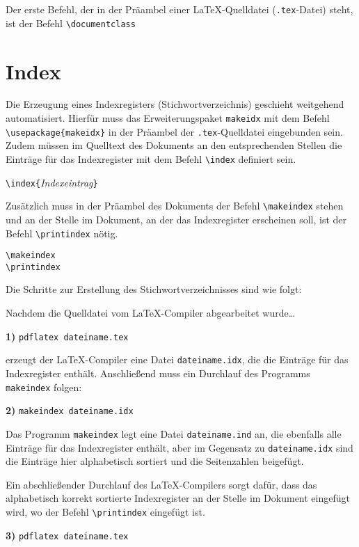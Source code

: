 Der erste Befehl, der in der Präambel einer \LaTeX-Quelldatei (\verb!.tex!-Datei) steht, ist der Befehl \verb!\documentclass!
\begin{document}
\section{Index}

Die Erzeugung eines
Indexregisters (Stichwortverzeichnis)
geschieht weitgehend automatisiert.
Hierfür muss das Erweiterungspaket \verb!makeidx! mit dem Befehl \verb!\usepackage{makeidx}! in der Präambel der \verb!.tex!-Quelldatei eingebunden sein.
Zudem müssen im Quelltext des Dokuments an den 
entsprechenden Stellen die 
Einträge für das Indexregister mit dem Befehl \verb!\index! definiert sein. 

\begin{boxedminipage}{\textwidth}
\texttt{\textbackslash index\{}\textsl{Indexeintrag}\texttt{\}} 
\end{boxedminipage}

Zusätzlich muss in der Präambel des Dokuments der Befehl \verb!\makeindex! stehen
und an der Stelle im Dokument, an der das Indexregister erscheinen soll, 
ist der Befehl \verb!\printindex! nötig.


\begin{boxedminipage}{\textwidth}
\texttt{\textbackslash makeindex} \\
\texttt{\textbackslash printindex} 
\end{boxedminipage}

Die Schritte zur Erstellung des Stichwortverzeichnisses 
sind wie folgt:

Nachdem die Quelldatei vom \LaTeX-Compiler abgearbeitet wurde\dots

\textbf{1)} \verb!pdflatex dateiname.tex!

erzeugt der \LaTeX-Compiler eine Datei 
\verb!dateiname.idx!, die 
die Einträge für das Indexregister 
enthält. Anschließend muss ein Durchlauf des Programms
\verb!makeindex! folgen:

\textbf{2)} \verb!makeindex dateiname.idx!

Das Programm \verb!makeindex! legt eine Datei \verb!dateiname.ind! an, 
die ebenfalls alle Einträge für das Indexregister enthält,
aber im Gegensatz zu \verb!dateiname.idx! sind die Einträge hier
alphabetisch sortiert und die Seitenzahlen beigefügt.

Ein abschließender Durchlauf des \LaTeX-Compilers sorgt dafür, dass das alphabetisch 
korrekt sortierte Indexregister an der Stelle im Dokument eingefügt 
wird, wo der Befehl \verb!\printindex! eingefügt ist.

\textbf{3)} \verb!pdflatex dateiname.tex!
\end{document}
